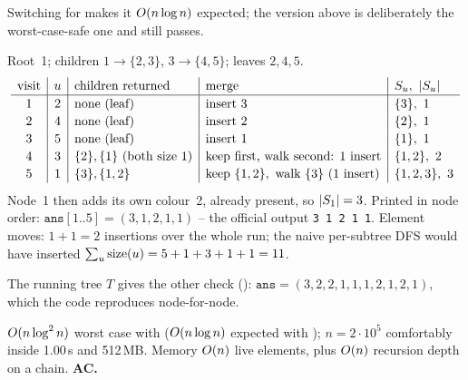 Switching  for  makes it
\(O(n\log n)\) expected; the  version above is deliberately the
worst-case-safe one and still passes.

\begin{tracebox}[CSES 1139: n=5, colours (2,3,2,2,1), edges 1-2,1-3,3-4,3-5]
Root~1; children \(1\!\to\!\{2,3\}\), \(3\!\to\!\{4,5\}\); leaves \(2,4,5\).
\[
\renewcommand{\arraystretch}{1.15}
\begin{array}{c|c|l|l|l}
\text{visit} & u & \text{children returned} & \text{merge} & S_u,\ \abs{S_u} \\ \hline
1 & 2 & \text{none (leaf)} & \text{insert } 3 & \{3\},\ 1\\
2 & 4 & \text{none (leaf)} & \text{insert } 2 & \{2\},\ 1\\
3 & 5 & \text{none (leaf)} & \text{insert } 1 & \{1\},\ 1\\
4 & 3 & \{2\},\{1\}\text{ (both size 1)} & \text{keep first, walk second: } 1\text{ insert} & \{1,2\},\ 2\\
5 & 1 & \{3\},\{1,2\} & \text{keep } \{1,2\},\text{ walk } \{3\}\text{ (1 insert)} & \{1,2,3\},\ 3
\end{array}
\]
Node~1 then adds its own colour~2, already present, so \(\lvert S_1\rvert=3\).
Printed in node order: \(\texttt{ans}[1..5]=(3,1,2,1,1)\) -- the official
output \texttt{3 1 2 1 1}.  Element moves: \(1+1=2\) insertions over the
whole run; the naive per-subtree DFS would have inserted
\(\sum_u\operatorname{size}(u)=5+1+3+1+1=11\).
\end{tracebox}

The running tree \(T\) gives the other check ():
\(\texttt{ans}=(3,2,2,1,1,1,2,1,2,1)\), which the code reproduces node-for-node.

\begin{complexitybox}
\(O(n\log^2 n)\) worst case with  (\(O(n\log n)\) expected
with ); \(n=2\cdot10^5\) comfortably inside 1.00\,s and
512\,MB.  Memory \(O(n)\) live elements, plus \(O(n)\) recursion depth
on a chain.  \textbf{AC.}
\end{complexitybox}

